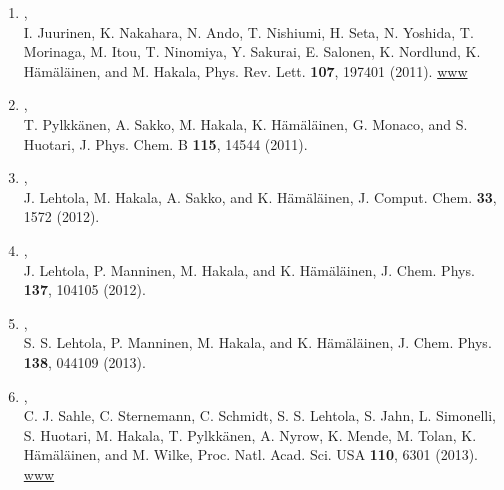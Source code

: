 \documentclass[12pt,a4]{report}
\begin{document}
\begin{enumerate}
\item{},
\\ I. Juurinen, K. Nakahara, N. Ando, T. Nishiumi, H. Seta, N. Yoshida, T. Morinaga, M. Itou, T. Ninomiya, 
Y. Sakurai, E. Salonen, K. Nordlund, K. H{\"a}m{\"a}l{\"a}inen, and M. Hakala, Phys. Rev. Lett. {\bf 107}, 197401 (2011). 
\href{http://link.aps.org/doi/10.1103/PhysRevLett.107.197401}{www}


\item{},\\
T. Pylkk{\"a}nen, A. Sakko, M. Hakala, K. H\"am\"al\"ainen, G. Monaco, 
and S. Huotari, J. Phys. Chem. B {\bf 115}, 14544 (2011).



\item{},\\ J. Lehtola, M. Hakala, A. Sakko, and K. H\"am\"al\"ainen, J. Comput. Chem. {\bf 33}, 1572 (2012).

\item{},\\ J. Lehtola, P. Manninen, M. Hakala, and K. H\"am\"al\"ainen, J. Chem. Phys. {\bf 137}, 104105 (2012).



\item{},\\ S. S. Lehtola, P. Manninen, M. Hakala, and K. H\"am\"al\"ainen, J. Chem. Phys. {\bf 138}, 044109 (2013).


\item{}, \\C. J. Sahle, C. Sternemann, C. Schmidt, S. S. Lehtola, S. Jahn, L. Simonelli, S. Huotari, M. Hakala, T. Pylkk{\"a}nen, A. Nyrow, K. Mende, M. Tolan, K. H{\"a}m{\"a}l{\"a}inen, and M. Wilke, Proc. Natl. Acad. Sci. USA {\bf 110}, 6301 (2013). 
\href{http://dx.doi.org/10.1073/pnas.1220301110}{www}


\end{enumerate}
\end{document}

